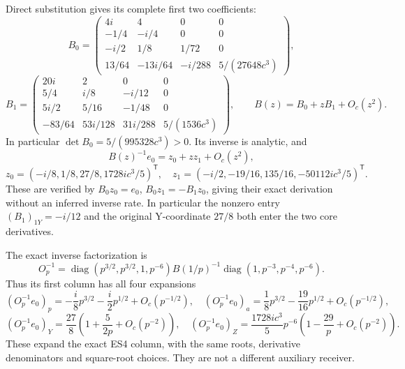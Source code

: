 \documentclass[11pt]{article}
\begin{document}
Direct substitution gives its complete first two coefficients: \[
B_0=\begin{pmatrix}
4i&4&0&0\\-1/4&-i/4&0&0\\-i/2&1/8&1/72&0\\
13/64&-13i/64&-i/288&5/(27648c^3)
\end{pmatrix},
\] \[
B_1=\begin{pmatrix}
20i&2&0&0\\5/4&i/8&-i/12&0\\5i/2&5/16&-1/48&0\\
-83/64&53i/128&31i/288&5/(1536c^3)
\end{pmatrix},\qquad B(z)=B_0+zB_1+O_c(z^2).
\tag{ES19}
\] In particular \(\det B_0=5/(995328c^3)>0\). Its inverse is analytic, and \[
B(z)^{-1}e_0=z_0+zz_1+O_c(z^2),
\] \[
z_0=(-i/8,1/8,27/8,1728ic^3/5)^{\mathsf T},\quad
z_1=(-i/2,-19/16,135/16,-50112ic^3/5)^{\mathsf T}.
\tag{ES20}
\] These are verified by \(B_0z_0=e_0\), \(B_0z_1=-B_1z_0\), giving their exact derivation without an inferred inverse rate. In particular the nonzero entry \((B_1)_{1Y}=-i/12\) and the original Y-coordinate \(27/8\) both enter the two core derivatives.

The exact inverse factorization is \[
O_p^{-1}=\operatorname{diag}(p^{3/2},p^{3/2},1,p^{-6})B(1/p)^{-1}
\operatorname{diag}(1,p^{-3},p^{-4},p^{-6}).
\tag{ES21}
\] Thus its first column has all four expansions \[
(O_p^{-1}e_0)_p=-\frac i8p^{3/2}-\frac i2p^{1/2}+O_c(p^{-1/2}),
\quad (O_p^{-1}e_0)_a=\frac18p^{3/2}-\frac{19}{16}p^{1/2}+O_c(p^{-1/2}),
\] \[
(O_p^{-1}e_0)_Y=\frac{27}{8}\left(1+\frac{5}{2p}+O_c(p^{-2})\right),
\quad (O_p^{-1}e_0)_Z=\frac{1728ic^3}{5}p^{-6}
\left(1-\frac{29}{p}+O_c(p^{-2})\right).
\tag{ES22}
\] These expand the exact ES4 column, with the same roots, derivative denominators and square-root choices. They are not a different auxiliary receiver.
\end{document}
